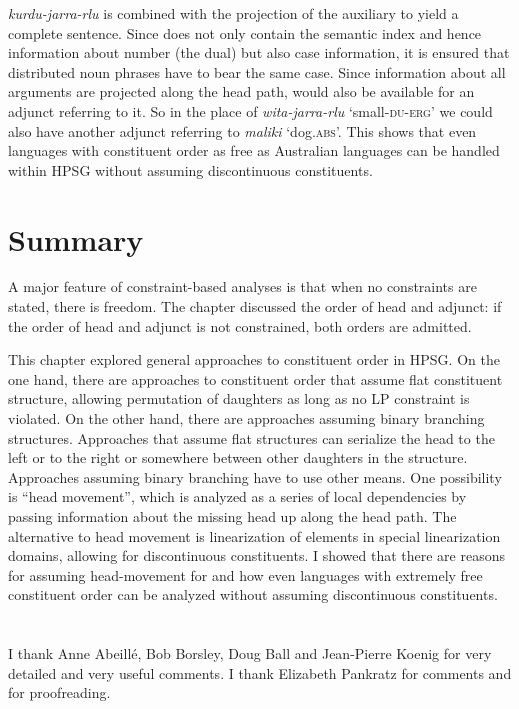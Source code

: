 \documentclass[output=paper,biblatex,babelshorthands,newtxmath,draftmode,colorlinks,citecolor=brown]{langscibook}
\begin{document}
\emph{kurdu-jarra-rlu} is combined with the projection of the auxiliary to yield a complete
sentence. Since  does not only contain the semantic index and hence information about number
(the dual) but also case information, it is ensured that distributed noun phrases have to bear the
same case. Since information about all arguments are projected along the head path,  would
also be available for an adjunct referring to it. So in the place of \emph{wita-jarra-rlu}
`small-\textsc{du}-\textsc{erg}' we could also have another adjunct referring to \emph{maliki}
`dog.\textsc{abs}'. This shows that even languages with constituent order as free as Australian
languages can be handled within HPSG without assuming discontinuous constituents.

\section{Summary}

A major feature of constraint-based analyses is that when no constraints are stated, there is
freedom. The chapter discussed the order of head and adjunct: if the order of head and adjunct is not
constrained, both orders are admitted. 

This chapter explored general approaches to constituent order in HPSG. On the one hand, there are
approaches to constituent order that assume flat constituent structure, allowing permutation of
daughters as long as no LP constraint is violated. On the other hand, there are approaches assuming
binary branching structures. Approaches that assume flat structures can serialize the head to the
left or to the right or somewhere between other daughters in the structure. Approaches assuming
binary branching have to use other means. One possibility is ``head movement'', which is analyzed as
a series of local dependencies by passing information about the missing head up along the head
path. The alternative to head movement is linearization of elements in special linearization
domains, allowing for discontinuous constituents. I showed that there are reasons for assuming
head-movement for  and how even languages with extremely free constituent order can be
analyzed without assuming discontinuous constituents.



\section*{\acknowledgmentsUS}

I thank Anne Abeillé, Bob Borsley, Doug Ball and Jean-Pierre Koenig for very detailed and very useful comments. I thank
Elizabeth Pankratz for comments and for proofreading.

{\sloppy
\printbibliography[heading=subbibliography,notkeyword=this] 
}
\end{document}
